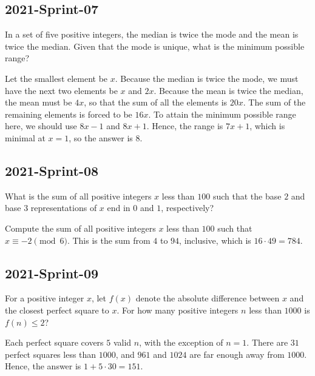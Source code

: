 \documentclass[12pt]{article}
\begin{document}
\subsection*{2021-Sprint-07}
In a set of five positive integers, the median is twice the mode and the mean is twice the median. Given that the mode is unique, what is the minimum possible range?
\begin{answer}
Let the smallest element be $x$. Because the median is twice the mode, we must have the next two elements be $x$ and $2x$. Because the mean is twice the median, the mean must be $4x$, so that the sum of all the elements is $20x$. The sum of the remaining elements is forced to be $16x$. To attain the minimum possible range here, we should use $8x-1$ and $8x+1$. Hence, the range is $7x+1$, which is minimal at $x=1$, so the answer is $\boxed{8}$.
\end{answer}

\subsection*{2021-Sprint-08}
What is the sum of all positive integers $x$ less than $100$ such that the base $2$ and base $3$ representations of $x$ end in $0$ and $1$, respectively?
\begin{answer}
Compute the sum of all positive integers $x$ less than $100$ such that $x \equiv -2 \pmod{6}$. This is the sum from $4$ to $94$, inclusive, which is $16\cdot 49 = \boxed{784}$.
\end{answer}

\subsection*{2021-Sprint-09}
For a positive integer $x$, let $f(x)$ denote the absolute difference between $x$ and the closest perfect square to $x$. For how many positive integers $n$ less than $1000$ is $f(n)\le 2$?
\begin{answer}
Each perfect square covers $5$ valid $n$, with the exception of $n=1$. There are $31$ perfect squares less than $1000$, and $961$ and $1024$ are far enough away from $1000$. Hence, the answer is $1+5\cdot 30 = \boxed{151}$.
\end{answer}
\end{document}
